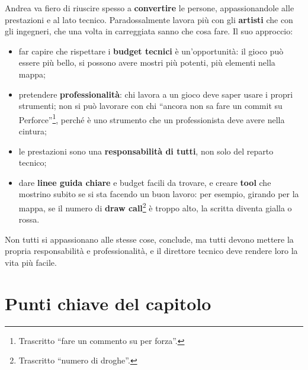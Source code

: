 Andrea va fiero di riuscire spesso a \textbf{convertire} le persone,
appassionandole alle prestazioni e al lato tecnico. Paradossalmente lavora più con
gli \textbf{artisti} che con gli ingegneri, che una volta in carreggiata sanno che
cosa fare. Il suo approccio:
\begin{itemize}
  \item far capire che rispettare i \textbf{budget tecnici} è un'opportunità: il
        gioco può essere più bello, si possono avere mostri più potenti, più
        elementi nella mappa;
  \item pretendere \textbf{professionalità}: chi lavora a un gioco deve saper usare
        i propri strumenti; non si può lavorare con chi ``ancora non sa fare un
        commit su Perforce''\footnote{Trascritto ``fare un commento su per
        forza''.}, perché è uno strumento che un professionista deve avere nella
        cintura;
  \item le prestazioni sono una \textbf{responsabilità di tutti}, non solo del
        reparto tecnico;
  \item dare \textbf{linee guida chiare} e budget facili da trovare, e creare
        \textbf{tool} che mostrino subito se si sta facendo un buon lavoro: per
        esempio, girando per la mappa, se il numero di \textbf{draw
        call}\footnote{Trascritto ``numero di droghe''.} è troppo alto, la scritta
        diventa gialla o rossa.
\end{itemize}
Non tutti si appassionano alle stesse cose, conclude, ma tutti devono mettere la
propria responsabilità e professionalità, e il direttore tecnico deve rendere loro
la vita più facile.

\section*{Punti chiave del capitolo}

